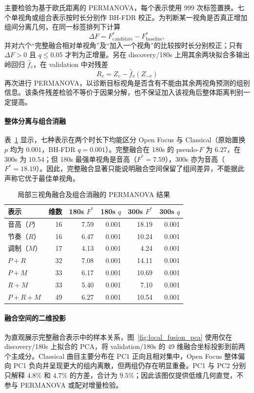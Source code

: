 \documentclass{article}
\begin{document}
主要检验为基于欧氏距离的 PERMANOVA，每个表示使用 $999$ 次标签置换。七个单视角或组合表示按时长分别作 BH-FDR 校正。为判断某一视角是否真正增加组间分离几何，在同一标签排列下计算
\[
\Delta F=F^{*}_{\mathrm{candidate}}-F^{*}_{\mathrm{baseline}},
\]
并对六个``完整融合相对单视角''及``加入一个视角''的比较按时长分别校正；只有 $\Delta F>0$ 且 $q\leq0.05$ 才判为正增量。另在 discovery/180s 上用其余两块拟合多输出岭回归 $\widehat f_v$，在 validation 中对残差
\[
R_v=Z_v-\widehat f_v(Z_{-v})
\]
再次进行 PERMANOVA，以诊断目标视角是否含有不能由其余两视角预测的组别信息。该条件残差检验不等价于因果分解，也不保证加入该视角后整体距离判别一定提高。

\paragraph{整体分离与组合消融}
表~\ref{tab:local_fusion_permanova} 显示，七种表示在两个时长下均能区分 Open Focus 与 Classical（原始置换 $p$ 均为 $0.001$，BH-FDR $q=0.001$）。完整融合在 180s 的 pseudo-$F$ 为 $6.27$，在 300s 为 $10.54$；但 180s 最强单视角是音高（$F^{*}=7.59$），300s 亦为音高（$F^{*}=18.19$）。因此，完整融合显著只能说明融合空间保留了组间差异，不能据此声称它优于最佳单视角。

\begin{table}[htbp]
\centering
\caption{局部三视角融合及组合消融的 PERMANOVA 结果}
\label{tab:local_fusion_permanova}
\setlength{\tabcolsep}{5pt}
\begin{tabular}{lrrrrr}
\toprule
表示 & 维数 & 180s $F^{*}$ & 180s $q$ & 300s $F^{*}$ & 300s $q$ \\
\midrule
音高（$P$） & 16 & 7.59 & 0.001 & 18.19 & 0.001 \\
节奏（$R$） & 16 & 6.47 & 0.001 & 10.24 & 0.001 \\
调制（$M$） & 17 & 4.13 & 0.001 & 4.24 & 0.001 \\
$P+R$ & 32 & 7.08 & 0.001 & 14.11 & 0.001 \\
$P+M$ & 33 & 6.17 & 0.001 & 10.69 & 0.001 \\
$R+M$ & 33 & 5.40 & 0.001 & 7.10 & 0.001 \\
$P+R+M$ & 49 & 6.27 & 0.001 & 10.54 & 0.001 \\
\bottomrule
\end{tabular}
\end{table}

\paragraph{融合空间的二维投影}
为直观展示完整融合表示中的样本关系，图~\ref{fig:local_fusion_pca} 使用仅在 discovery/180s 上拟合的 PCA，将 validation/180s 的 49 维融合坐标投影到前两个主成分。Classical 曲目主要分布在 PC1 正向且相对集中，Open Focus 整体偏向 PC1 负向并呈现更大的组内离散，但两组仍存在明显重叠。PC1 与 PC2 分别只解释 $4.8\%$ 和 $4.7\%$ 的方差，合计为 $9.5\%$；因此该图仅提供低维几何直觉，不参与 PERMANOVA 或配对增量检验。
\end{document}
